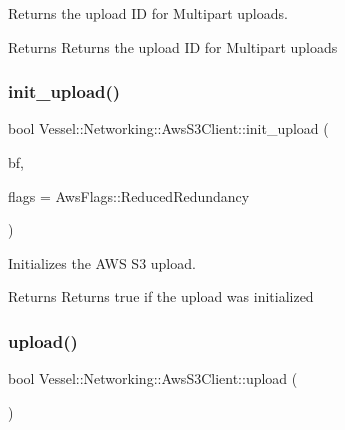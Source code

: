 Returns the upload ID for Multipart uploads. 

\begin{DoxyReturn}{Returns}
Returns the upload ID for Multipart uploads 
\end{DoxyReturn}
\mbox{\label{class_vessel_1_1_networking_1_1_aws_s3_client_a2e08698221d54ca88ac5055d991eb21f}} 
\subsubsection{\texorpdfstring{init\+\_\+upload()}{init\_upload()}}
{\footnotesize\ttfamily bool Vessel\+::\+Networking\+::\+Aws\+S3\+Client\+::init\+\_\+upload (\begin{DoxyParamCaption}\item[{const \hyperlink{class_vessel_1_1_file_1_1_backup_file}{Backup\+File} \&}]{bf,  }\item[{Aws\+Flags}]{flags = {\ttfamily AwsFlags\+:\+:ReducedRedundancy} }\end{DoxyParamCaption})}



Initializes the A\+WS S3 upload. 

\begin{DoxyReturn}{Returns}
Returns true if the upload was initialized 
\end{DoxyReturn}
\mbox{\label{class_vessel_1_1_networking_1_1_aws_s3_client_ae78ce420213ab93e81b6fee0911c4746}} 
\subsubsection{\texorpdfstring{upload()}{upload()}}
{\footnotesize\ttfamily bool Vessel\+::\+Networking\+::\+Aws\+S3\+Client\+::upload (\begin{DoxyParamCaption}{ }\end{DoxyParamCaption})}



